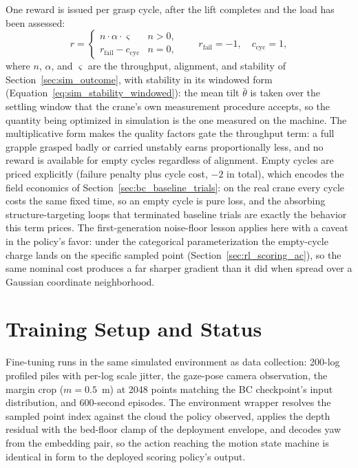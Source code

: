 One reward is issued per grasp cycle, after the lift completes and the load
has been assessed:
\begin{equation}
  r =
  \begin{cases}
    n \cdot \alpha \cdot \varsigma & n > 0, \\[2pt]
    r_{\mathrm{fail}} - c_{\mathrm{cyc}} & n = 0,
  \end{cases}
  \qquad r_{\mathrm{fail}} = -1, \quad c_{\mathrm{cyc}} = 1,
  \label{eq:rl_reward}
\end{equation}
where $n$, $\alpha$, and $\varsigma$ are the throughput, alignment, and
stability of Section~\ref{sec:sim_outcome}, with stability in its windowed
form (Equation~\eqref{eq:sim_stability_windowed}): the mean tilt
$\bar{\theta}$ is taken over the settling window that the crane's own
measurement procedure accepts, so the quantity being optimized in simulation
is the one measured on the machine. The multiplicative
form makes the quality factors gate the throughput term: a full grapple
grasped badly or carried unstably earns proportionally less, and no reward
is available for empty cycles regardless of alignment. Empty cycles are
priced explicitly (failure penalty plus cycle cost, $-2$ in total), which
encodes the field economics of Section~\ref{sec:bc_baseline_trials}: on the
real crane every cycle costs the same fixed time, so an empty cycle is pure
loss, and the absorbing structure-targeting loops that terminated baseline
trials are exactly the behavior this term prices. The first-generation
noise-floor lesson applies here with a caveat in the policy's favor: under
the categorical parameterization the empty-cycle charge lands on the
specific sampled point (Section~\ref{sec:rl_scoring_ac}), so the same
nominal cost produces a far sharper gradient than it did when spread over a
Gaussian coordinate neighborhood.

\section{Training Setup and Status}
\label{sec:rl_setup}

Fine-tuning runs in the same simulated environment as data collection:
200-log profiled piles with per-log scale jitter, the gaze-pose camera
observation, the margin crop ($m = 0.5$~m) at 2048 points matching the BC
checkpoint's input distribution, and 600-second episodes. The environment
wrapper resolves the sampled point index against the cloud the policy
observed, applies the depth residual with the bed-floor clamp of the
deployment envelope, and decodes yaw from the embedding pair, so the action
reaching the motion state machine is identical in form to the deployed
scoring policy's output.

